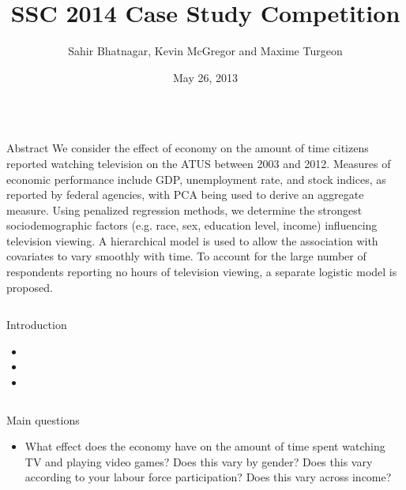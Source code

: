 \documentclass[final]{beamer}
\title{SSC 2014 Case Study Competition}
\author{Sahir Bhatnagar, Kevin McGregor and Maxime Turgeon}
\institute{Department of Epidemiology, Biostatistics and Occupational Health, McGill University}
\date{May 26, 2013}
\newcounter{acolumn}%
\def\autoheight{\vspace*{0pt}}%
\begin{document}
  \begin{frame} 
    \vfill
    
        \begin{acolumns}[t]
          \begin{column}{.32\linewidth}
          
            \begin{block}{Abstract}
    			We consider the effect of economy on the amount of time citizens reported watching television on the ATUS  between 2003 and 2012. Measures of economic performance include GDP, unemployment rate, and stock indices, as reported by federal agencies, with PCA being used to derive an aggregate measure. Using penalized regression methods, we determine the strongest sociodemographic factors (e.g. race, sex, education level, income) influencing television viewing. A hierarchical model is used to allow the association with covariates to vary smoothly with time. To account for the large number of respondents reporting no hours of television viewing, a separate logistic model is proposed.
              \autoheight 
            \end{block}
            
          
          \end{column}
          
          \begin{column}{.32\linewidth}
            \begin{block}{Introduction}
              \begin{itemize}
              	\item 
              	\item 
              	\item 
              \end{itemize}
              \autoheight 
            \end{block}
    
          \end{column}
          
          \begin{column}{.32\linewidth}
           \begin{block}{Main questions}
            
            \begin{itemize}
            	\item What effect does the economy have on the amount of time spent watching TV and playing video games? Does this vary by gender? Does this vary according to your labour force participation? Does this vary across income?


\end{itemize}
\end{block}
\end{column}
\end{acolumns}
\end{frame}
\end{document}
